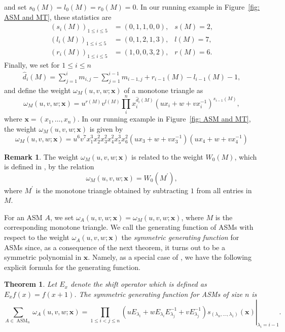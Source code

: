 \documentclass[11pt]{article}
\newtheorem{thm}[theo]{Theorem}
\theoremstyle{definition}
\newtheorem{rema}[theo]{Remark}
\numberwithin{equation}{section}
\newcommand{\x}{\mathbf{x}}
\DeclareMathOperator{\ASM}{ASM}
\newcounter{x}
\newcounter{y}
\newcounter{z}
\begin{document}
and set $s_0(M)=l_0(M)=r_0(M)=0$. In our running example in Figure~\ref{fig: ASM and MT}, these statistics are
\begin{align*}
(s_i(M))_{1 \leq i \leq 5} &= (0,1,1,0,0), & s(M) = 2,\\
(l_i(M))_{1 \leq i \leq 5} &= (0,1,2,1,3), & l(M) = 7,\\
(r_i(M))_{1 \leq i \leq 5} &= (1,0,0,3,2), & r(M) = 6. 
\end{align*}
Finally, we set for $1 \leq i \leq n$
\begin{align*}
\widehat d_i(M) = \sum_{j=1}^i m_{i,j} - \sum_{j=1}^{i-1} m_{i-1,j} +r_{i-1}(M) -l_{i-1}(M)-1,
\end{align*}
and define the weight $\omega_M(u,v,w;\x)$ of a monotone triangle as
\begin{equation}
\label{def:omega} 
\omega_M(u,v,w;\x) =  u^{r(M)} v^{l(M)}  \prod_i^{n} x_i^{\widehat d_i(M)} ( u x_i + w + v x_i^{-1} )^{s_{i-1}(M)} ,
\end{equation}
where $\x=(x_1,\ldots,x_n)$. In our running example in Figure~\ref{fig: ASM and MT}, the weight $\omega_M(u,v,w;\x)$ is given by
\[
\omega_M(u,v,w;\x) =  u^6  v^7 x_1^3 x_2^2 x_3^2 x_4^2 x_5^3 x_6^2 ( u x_3 + w + v x_3^{-1})( u x_4 + w +v x_4^{-1}) 
\]
\begin{rema}
\label{rem: slightly different weight}
The weight $\omega_M(u,v,w;\x)$ is related to the weight $W_0(M)$, which is defined in \cite[p. 17]{FischerSchreierAigner23}, by the relation 
\[
\omega_M(u,v,w;\x) =W_0(M^\prime),
\]
where $M^\prime$ is the monotone triangle obtained by subtracting $1$ from all entries in $M$.
\end{rema}

For an ASM $A$, we set $\omega_A(u,v,w;\x)=\omega_M(u,v,w;\x)$, where $M$ is the corresponding monotone triangle. We call the generating function of ASMs with respect to the weight $\omega_A(u,v,w;\x)$ the \emph{symmetric generating function} for ASMs since, as a consequence of the next theorem, it turns out to be a symmetric polynomial in $\x$.  Namely, as a special case of \cite[Theorem 3.1]{FischerSchreierAigner23}, we have the following explicit formula for the generating function.

\begin{thm}
\label{thm: sym gen fct via Operatoren}
Let $E_x$ denote the \emph{shift operator} which is defined as $E_x f(x)=f(x+1)$.
The \emph{symmetric generating function} for ASMs of size $n$ is
\begin{equation}
\label{eq: sym gen fct via Operatoren}
\sum_{A \in \ASM_n} \omega_A(u,v,w;\x) = \left.\prod_{1 \leq i < j \leq n} \left(u E_{\lambda_i}  + w E_{\lambda_i}E_{\lambda_j}^{-1} +  v E_{\lambda_j}^{-1}  \right) s_{(\lambda_n,\ldots,\lambda_1)}(\x)\right|_{\lambda_i=i-1}.
\end{equation}
\end{thm}
\end{document}
